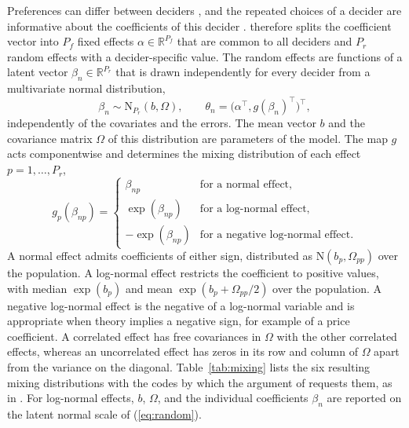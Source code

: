 \documentclass[article,shortnames]{jss}
\newcommand{\fct}[1]{\code{#1()}}
\begin{document}
Preferences can differ between deciders \citep{BenAkiva1993}, and the repeated
choices of a decider are informative about the coefficients of this decider
\citep{Allenby1998}.  therefore splits the coefficient vector into
$P_f$ fixed effects $\alpha \in \mathbb{R}^{P_f}$ that are common to all
deciders and $P_r$ random effects with a decider-specific value. The random
effects are functions of a latent vector $\beta_n \in \mathbb{R}^{P_r}$ that is
drawn independently for every decider from a multivariate normal distribution,
%
\begin{equation}
  \label{eq:random}
  \beta_n \sim \mathrm{N}_{P_r}(b, \Omega), \qquad \theta_n = \big(\alpha^\top,
  g(\beta_n)^\top\big)^\top,
\end{equation}
%
independently of the covariates and the errors. The mean vector $b$ and the
covariance matrix $\Omega$ of this distribution are parameters of the model. The
map $g$ acts componentwise and determines the mixing distribution of each effect
$p = 1, \dots, P_r$,
%
\begin{equation}
  \label{eq:mixing_map}
  g_p(\beta_{np}) =
  \begin{cases}
    \beta_{np} & \text{for a normal effect,} \\
    \exp(\beta_{np}) & \text{for a log-normal effect,} \\
    -\exp(\beta_{np}) & \text{for a negative log-normal effect.}
  \end{cases}
\end{equation}
%
A normal effect admits coefficients of either sign, distributed as
$\mathrm{N}(b_p, \Omega_{pp})$ over the population. A log-normal effect
restricts the coefficient to positive values, with median $\exp(b_p)$ and mean
$\exp(b_p + \Omega_{pp} / 2)$ over the population. A negative log-normal effect
is the negative of a log-normal variable and is appropriate when theory implies
a negative sign, for example of a price coefficient. A correlated effect has
free covariances in $\Omega$ with the other correlated effects, whereas an
uncorrelated effect has zeros in its row and column of $\Omega$ apart from the
variance on the diagonal. Table~\ref{tab:mixing} lists the six resulting mixing
distributions with the codes by which the argument  of
\fct{fit} requests them, as in
. For log-normal effects,
$b$, $\Omega$, and the individual coefficients $\beta_n$ are reported on the
latent normal scale of (\ref{eq:random}).
\end{document}
